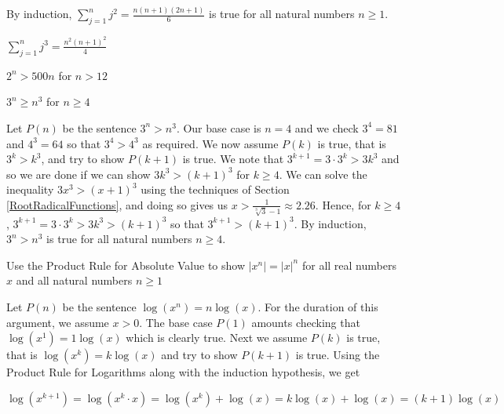 \documentclass{ximera}
\begin{document}
\begin{question}
\begin{problem}
\begin{solution}
 By induction, $\displaystyle{ \sum_{j=1}^{n} j^2 = \frac{n(n+1)(2n+1)}{6}}$ is true for all natural numbers $n \geq 1$.
\end{solution}
    
\end{problem}

\begin{problem}
    $\displaystyle{ \sum_{j=1}^{n} j^3 = \frac{n^2(n+1)^2}{4}}$
\end{problem}

\begin{problem}
    $2^{n} > 500 n$ for $n > 12$
\end{problem}

\begin{problem}
    $3^{n} \geq n^3$ for $n \geq 4$

\begin{solution}
Let $P(n)$  be the sentence $3^n > n^3$.  Our base case is $n=4$ and we check $3^4 = 81$ and $4^3 = 64$ so that $3^4 > 4^3$ as required.  We now assume $P(k)$ is true, that is $3^k > k^3$, and try to show $P(k+1)$ is true.  We note that $3^{k+1} = 3 \cdot 3^{k} > 3k^3$ and so we are done if we can show $3k^3 > (k+1)^3$ for $k \geq 4$. We can solve the inequality $3x^3 > (x+1)^3$ using the techniques of Section \ref{RootRadicalFunctions}, and doing so gives us $x > \frac{1}{\sqrt[3]{3}-1} \approx 2.26.$  Hence, for $k \geq 4$, $3^{k+1} = 3 \cdot 3^{k} > 3k^3 > (k+1)^3$ so that $3^{k+1} > (k+1)^3$.   By induction, $3^n > n^3$ is true for all natural numbers $n \geq 4$.
\end{solution}
\end{problem}
 
\begin{problem}
    Use the Product Rule for Absolute Value to show  $\left|x^{n}\right| = |x|^{n}$ for all real numbers $x$ and all natural numbers $n \geq 1$

\begin{solution}
Let $P(n)$ be the sentence $\log\left(x^n \right) = n \log(x)$.  For the duration of this argument, we assume $x > 0$. The base case $P(1)$ amounts checking that $\log\left(x^1\right) = 1 \log(x)$ which is clearly true.  Next we assume $P(k)$ is true, that is $\log\left(x^{k}\right) = k \log(x)$ and try to show $P(k+1)$ is true.  Using the Product Rule for Logarithms along with the induction hypothesis, we get

 \[\log\left(x^{k+1}\right) = \log\left(x^{k} \cdot x\right) = \log\left(x^{k}\right) + \log(x) = k \log(x) + \log(x) = (k+1) \log(x) \]
 

\end{solution}
\end{problem}
\end{question}
\end{document}
